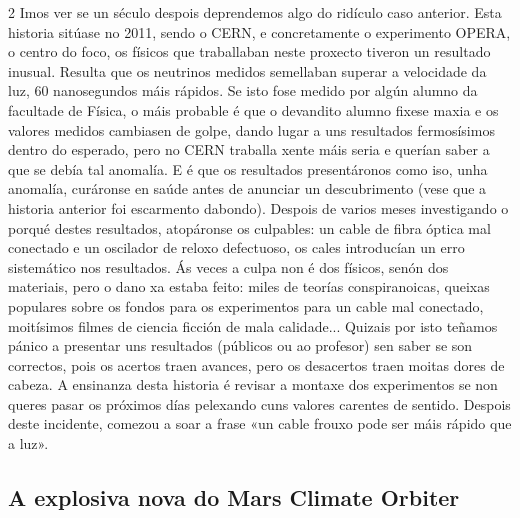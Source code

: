 \begin{multicols}{2}
Imos ver se un século despois deprendemos algo do ridículo caso anterior. Esta
historia sitúase no 2011, sendo o CERN, e concretamente o experimento OPERA, o
centro do foco, os físicos que traballaban neste proxecto tiveron un resultado
inusual. Resulta que os neutrinos medidos semellaban superar a velocidade da
luz, 60 nanosegundos máis rápidos. Se isto fose medido por algún alumno da   %
facultade de Física, o máis probable é que o devandito alumno fixese maxia e os
valores medidos cambiasen de golpe, dando lugar a uns resultados fermosísimos
dentro do esperado, pero no CERN traballa xente máis seria e querían saber a
que se debía tal anomalía. E é que os resultados presentáronos como iso, unha
anomalía, curáronse en saúde antes de anunciar un descubrimento (vese que a
historia anterior foi escarmento dabondo). Despois de varios meses investigando
o porqué destes resultados, atopáronse os culpables: un cable de fibra óptica %
mal conectado e un oscilador de reloxo defectuoso, os cales introducían un erro
sistemático nos resultados. Ás veces a culpa non é dos físicos, senón dos
materiais, pero o dano xa estaba feito: miles de teorías conspiranoicas,
queixas populares sobre os fondos para os experimentos para un cable mal
conectado, moitísimos filmes de ciencia ficción de mala calidade... Quizais por
isto teñamos pánico a presentar uns resultados (públicos ou ao profesor) sen
saber se son correctos, pois os acertos traen avances, pero os desacertos traen
moitas dores de cabeza. A ensinanza desta historia é revisar a montaxe dos
experimentos se non queres pasar os próximos días pelexando cuns valores
carentes de sentido. Despois deste incidente, comezou a soar a frase «un cable
frouxo pode ser máis rápido que a luz».

\subsection*{A explosiva nova do Mars Climate Orbiter} %


\end{multicols}
